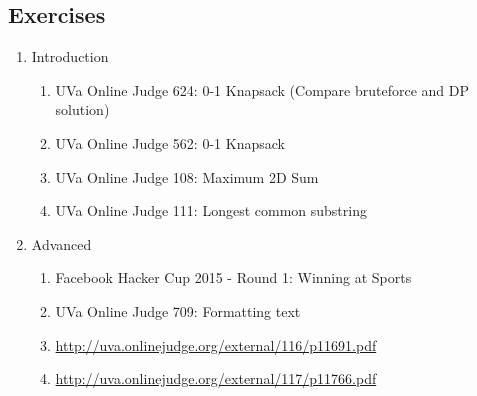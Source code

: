 \subsection{Exercises}
\begin{enumerate}
 \item Introduction
 \begin{enumerate}
  \item UVa Online Judge 624: 0-1 Knapsack (Compare bruteforce and DP solution)
  \item UVa Online Judge 562: 0-1 Knapsack
  \item UVa Online Judge 108: Maximum 2D Sum
  \item UVa Online Judge 111: Longest common substring
 \end{enumerate}

 \item Advanced
 \begin{enumerate}
  \item Facebook Hacker Cup 2015 - Round 1: Winning at Sports
  \item UVa Online Judge 709: Formatting text
  \item \url{http://uva.onlinejudge.org/external/116/p11691.pdf}
  \item \url{http://uva.onlinejudge.org/external/117/p11766.pdf}
 \end{enumerate}

\end{enumerate}
